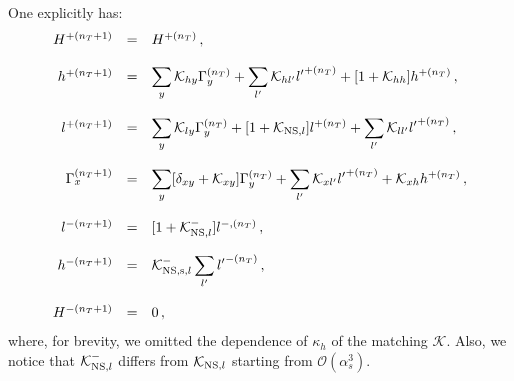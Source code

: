 \documentclass[10pt,a4paper]{article}
\begin{document}
One explicitly has:
\begin{equation}
\begin{array}{rcl}
  H^{+(n_T+1)} &=& H^{+(n_T)}\,,\\
\\
   h^{+(n_T+1)}&=&\displaystyle \sum_y\mathcal{K}_{hy}\Gamma_y^{(n_T)} + \sum_{l'}\mathcal{K}_{hl'}{l'}^{+(n_T)}+[1+\mathcal{K}_{hh}]h^{+(n_T)}\,,\\
  \\
   l^{+(n_T+1)}&=&\displaystyle\sum_y\mathcal{K}_{ly}\Gamma_y^{(n_T)}+[1+\mathcal{K}_{{\rm NS},l}]l^{+(n_T)}+\sum_{l'}\mathcal{K}_{ll'} {l'}^{+(n_T)}\,,\\
  \\
   \Gamma_x^{(n_T+1)}&=&\displaystyle\sum_y[\delta_{xy}+\mathcal{K}_{xy}]\Gamma_y^{(n_T)}+\sum_{l'}\mathcal{K}_{xl'} {l'}^{+(n_T)} + \mathcal{K}_{xh}h^{+(n_T)}\,,\\
  \\
  l^{-(n_T+1)} &=& [1+\mathcal{K}_{{\rm NS},l}^-]l^{-,(n_T)}\,,\\
\\
  h^{-(n_T+1)} &=& \displaystyle\mathcal{K}_{{\rm NS,s},l}^-\sum_{l'}{l'}^{-(n_T)}\,,\\
\\
  H^{-(n_T+1)} &=& 0\,,
\end{array}
\end{equation}
where, for brevity, we omitted the dependence of $\kappa_h$ of the
matching $\mathcal{K}$. Also, we notice that
$\mathcal{K}_{{\rm NS},l}^-$ differs from $\mathcal{K}_{{\rm NS},l}$
starting from $\mathcal{O}(\alpha_s^3)$.
\end{document}

